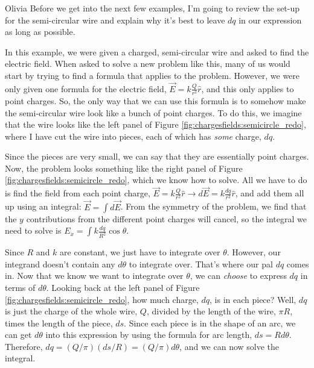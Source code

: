 \begin{studentOpinion}{Olivia}
Before we get into the next few examples, I'm going to review the set-up for the  semi-circular wire and explain why it's best to leave $dq$ in our expression as long as possible.

In this example, we were given a charged, semi-circular wire and asked to find the electric field. When asked to solve a new problem like this, many of us would start by trying to find a formula that applies to the problem. However, we were only given one formula for the electric field, $\vec E = k\frac{Q}{r^2}\hat r$, and this only applies to point charges. So, the only way that we can use this formula is to somehow make the semi-circular wire look like a bunch of point charges. To do this, we imagine that the wire looks like the left panel of Figure \ref{fig:chargesfields:semicircle_redo}, where I have cut the wire into pieces, each of which has \textit{some} charge, $dq$. 

 Since the pieces are very small, we can say that they are essentially point charges. Now, the problem looks something like the right panel of Figure \ref{fig:chargesfields:semicircle_redo}, which we know how to solve. All we have to do is find the field from each point charge, $\vec E = k\frac{Q}{r^2}\hat r \rightarrow d\vec E = k\frac{dq}{r^2}\hat r$, and add them all up using an integral: $\vec E=\int d\vec E$. From the symmetry of the problem, we find that the $y$ contributions from the different point charges will cancel, so the  integral we need to solve is $E_x=\int k\frac{dq}{R^2}\cos\theta$.  

Since $R$ and $k$ are constant, we just have to integrate over $\theta$. However, our integrand doesn't contain any $d\theta$ to integrate over. That's where our pal $dq$ comes in. Now that we know we want to integrate over $\theta$, we can \textit{choose} to express $dq$ in terms of $d\theta$. Looking back at the left panel of Figure \ref{fig:chargesfields:semicircle_redo}, how much charge, $dq$, is in each piece? Well, $dq$ is just the charge of the whole wire, $Q$, divided by the length of the wire, $\pi R$, times the length of the piece, $ds$. Since each piece is in the shape of an arc, we can get $d\theta$ into this expression by using the formula for arc length, $ds=Rd\theta$. Therefore, $dq=(Q/\pi)( ds/R)=(Q/\pi)d\theta$, and we can now solve the integral.
\end{studentOpinion}
